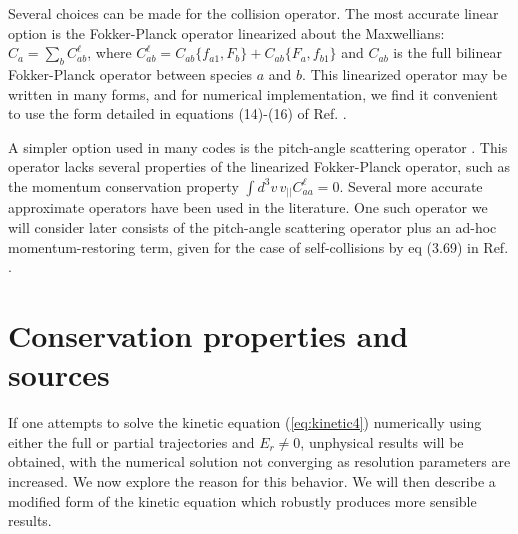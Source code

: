 \documentclass[12pt,superscriptaddress]{revtex4}
\begin{document}
Several choices can be made for the collision operator.
The most accurate linear option is the Fokker-Planck operator \cite{RMJ,PerBook}
linearized about the Maxwellians: $C_a = \sum_b C_{ab}^{\ell}$,
where $C_{ab}^{\ell} = C_{ab}\{f_{a1},F_{b}\} + C_{ab} \{ F_{a}, f_{b1}\}$
and $C_{ab}$ is the full bilinear Fokker-Planck operator between species $a$ and $b$.
This linearized operator may be written in many forms, and for numerical implementation,
we find it convenient to use the form detailed in equations (14)-(16) of Ref. \cite{speedGrids}.

A simpler option used in many codes is the pitch-angle scattering operator \cite{BeidlerBigBenchmarking}.
This operator lacks several properties of the linearized Fokker-Planck operator,
such as the momentum conservation property $\int d^3v \, v_{||} C_{aa}^{\ell}=0$.
Several more accurate approximate operators have been used in the literature.
One such operator we will consider later consists of the pitch-angle scattering operator
plus an ad-hoc momentum-restoring term, given for the case of self-collisions
by eq (3.69) in Ref. \cite{PerBook}.

\section{Conservation properties and sources}
\label{sec:sources}

If one attempts to solve the kinetic equation (\ref{eq:kinetic4}) numerically using either the full or partial trajectories
and $E_r \neq 0$, unphysical results will be obtained, with
the numerical solution not converging as resolution parameters are increased.
We now explore the reason for this behavior.
We will then describe a modified form of the kinetic equation which robustly produces more sensible results.
\end{document}
